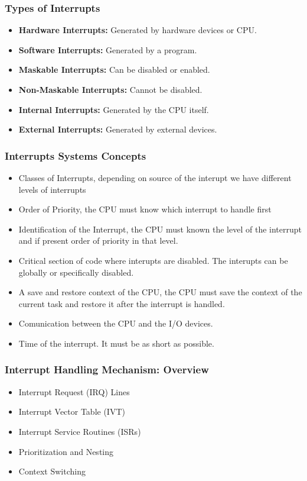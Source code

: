 \begin{frame}
    \frametitle{Types of Interrupts}
        \begin{itemize}
            \item \textbf{Hardware Interrupts:} Generated by hardware devices or CPU.
            \item \textbf{Software Interrupts:} Generated by a program.
            \item \textbf{Maskable Interrupts:} Can be disabled or enabled.
            \item \textbf{Non-Maskable Interrupts:} Cannot be disabled.
            \item \textbf{Internal Interrupts:} Generated by the CPU itself.
            \item \textbf{External Interrupts:} Generated by external devices.
        \end{itemize}
\end{frame}

\begin{frame}
    \frametitle{Interrupts Systems Concepts}
    \begin{itemize}
        \item Classes of Interrupts, depending on source of the interupt we have different levels of interrupts
        \item Order of Priority, the CPU must know which interrupt to handle first
        \item Identification of the Interrupt, the CPU must known the level of the interrupt and if present order of priority in that level.
        \item Critical section of code where interupts are disabled. The interupts can be globally or specifically disabled.
        \item A save and restore context of the CPU, the CPU must save the context of the current task and restore it after the interrupt is handled.
        \item Comunication between the CPU and the I/O devices.
        \item Time of the interrupt. It must be as short as possible.
    \end{itemize}
\end{frame}

\begin{frame}
    \frametitle{Interrupt Handling Mechanism: Overview}
    \begin{itemize}
        \item Interrupt Request (IRQ) Lines
        \item Interrupt Vector Table (IVT)
        \item Interrupt Service Routines (ISRs)
        \item Prioritization and Nesting
        \item Context Switching
    \end{itemize}
\end{frame}

